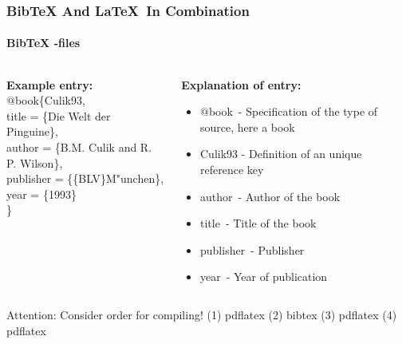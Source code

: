 \begin{frame}
\frametitle{BibTeX And \LaTeX ~In Combination}
\framesubtitle{BibTeX -files}
\begin{columns}
\begin{column}{0.52\textwidth}
\textbf{Example entry:}\\[1em]

\color{nounibaredI}$@$book\color{black}\{Culik93,\\
\color{nounibaredI}title\color{black} = \{Die Welt der Pinguine\},\\
\color{nounibaredI}author\color{black} = \{B.M. Culik and R. P. Wilson\},\\
\color{nounibaredI}publisher\color{black} = \{\{BLV\}M"unchen\},\\
\color{nounibaredI}year\color{black} = \{1993\}\\
\}
\end{column}
\begin{column}{0.55\textwidth}
\textbf{Explanation of entry:}
\begin{itemize}
\item \color{nounibaredI}$@$book\color{black}~- Specification of the type of source, here a book
\item Culik93 - Definition of an unique reference key
\item \color{nounibaredI}author\color{black}~- Author of the book
\item \color{nounibaredI}title\color{black}~- Title of the book
\item \color{nounibaredI}publisher\color{black}~- Publisher
\item \color{nounibaredI}year\color{black}~- Year of publication
\end{itemize}
\end{column}
\end{columns}
\begin{alertblock}{Attention: Consider order for compiling!}
(1) pdflatex (2) bibtex (3) pdflatex (4) pdflatex
\end{alertblock}
\end{frame}

